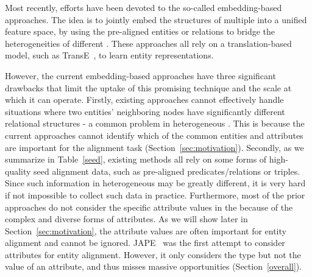 	Most recently, efforts have been devoted to the so-called \KG embedding-based approaches. The idea is to jointly embed the structures
of multiple \KGs into a unified feature space, by using the pre-aligned entities or relations to bridge the heterogeneities of different
\KGs. These approaches all rely on a translation-based model, such as TransE~\cite{bordes2013translating}, to learn entity representations.

However, the current \KG embedding-based approaches have three significant drawbacks that limit the uptake of this promising technique and
the scale at which it can operate. Firstly, existing approaches cannot effectively handle situations where two entities' neighboring nodes
have significantly different relational structures - a common problem in heterogeneous \KGs. This is because the current approaches cannot
identify which of the common entities and attributes are important for the alignment task (Section~\ref{sec:motivation}). Secondly, as we
summarize in Table~\ref{seed}, existing methods all rely on some forms of high-quality seed alignment data, such as pre-aligned \KG
predicates/relations or triples. Since such information in heterogeneous \KGs may be greatly different, it is very hard if not impossible
to collect such data in practice. Furthermore, most of the prior approaches do not consider the specific attribute values in the \KGs
because of the complex and diverse forms of attributes. As we will show later in Section~\ref{sec:motivation}, the attribute values are
often important for entity alignment and cannot be ignored. JAPE~\cite{sun2017cross} was the first attempt to consider attributes for
entity alignment. However, it only considers the type but not the value of an attribute, and thus misses massive opportunities
(Section~\ref{overall}).



